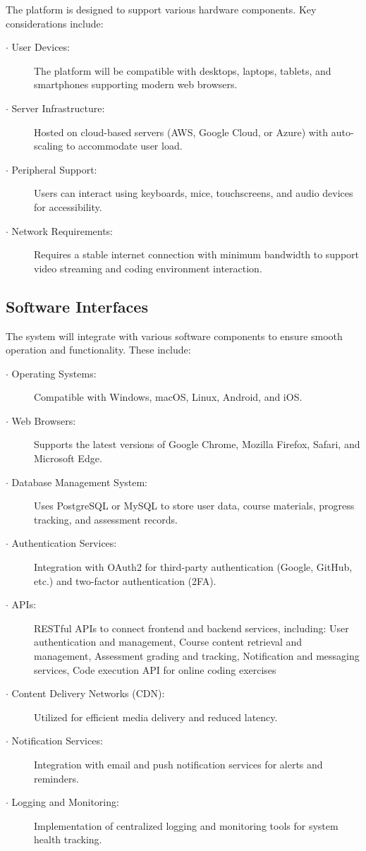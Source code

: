 \documentclass[a4paper, 11pt]{scrreprt}
\begin{document}
The platform is designed to support various hardware components. Key considerations include:
\begin{description}
    \item[$\cdot$ User Devices:] The platform will be compatible with desktops, laptops, tablets, and smartphones supporting modern web browsers.
    \item[$\cdot$ Server Infrastructure:] Hosted on cloud-based servers (AWS, Google Cloud, or Azure) with auto-scaling to accommodate user load.
    \item[$\cdot$ Peripheral Support:] Users can interact using keyboards, mice, touchscreens, and audio devices for accessibility.
    \item[$\cdot$ Network Requirements:] Requires a stable internet connection with minimum bandwidth to support video streaming and coding environment interaction.
\end{description}

\subsection{Software Interfaces}

The system will integrate with various software components to ensure smooth operation and functionality. These include:
\begin{description}
    \item[$\cdot$ Operating Systems:] Compatible with Windows, macOS, Linux, Android, and iOS.
    \item[$\cdot$ Web Browsers:] Supports the latest versions of Google Chrome, Mozilla Firefox, Safari, and Microsoft Edge.
    \item[$\cdot$ Database Management System:] Uses PostgreSQL or MySQL to store user data, course materials, progress tracking, and assessment records.
    \item[$\cdot$ Authentication Services:] Integration with OAuth2 for third-party authentication (Google, GitHub, etc.) and two-factor authentication (2FA).
    \item[$\cdot$ APIs:] RESTful APIs to connect frontend and backend services, including: User authentication and management, Course content retrieval and management, Assessment grading and tracking, Notification and messaging services, Code execution API for online coding exercises
    \item[$\cdot$ Content Delivery Networks (CDN):] Utilized for efficient media delivery and reduced latency.
    \item[$\cdot$ Notification Services:] Integration with email and push notification services for alerts and reminders.
    \item[$\cdot$ Logging and Monitoring:] Implementation of centralized logging and monitoring tools for system health tracking.
\end{description}
\end{document}
